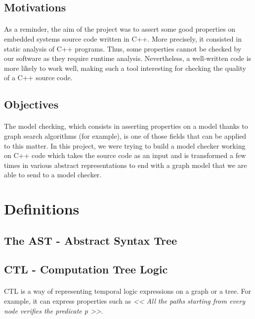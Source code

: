 \documentclass{report}
\begin{document}
\subsection{Motivations}

\paragraph{}
\hspace{4mm}As a reminder, the aim of the project was to assert some good properties on embedded systems source code written in C++. More precisely,
it consisted in static analysis of C++ programs. Thus, some properties cannot be checked by our software as they require runtime analysis.
Nevertheless, a well-written code is more likely to work well, making such a tool interesting for checking the quality of a C++ source code.

\subsection{Objectives}

\paragraph{}
\hspace{4mm}The model checking, which consists in asserting properties 
on a model thanks to graph search algorithms (for example),
 is one of those fields that can be applied to this matter.
 In this project, we were trying to build a model checker working
 on C++ code which takes the source code as an input and is 
transformed a few times in various abstract representations to end 
with a graph model that we are able to send to a model checker.

\section{Definitions}

\subsection{The AST - Abstract Syntax Tree}

\subsection{CTL - Computation Tree Logic}

\paragraph{}
\hspace{4mm}CTL is a way of representing temporal logic expressions on a graph or a tree. For example, it can
express properties such as \textit{<< All the paths starting from every node verifies the predicate p >>}.
\end{document}
